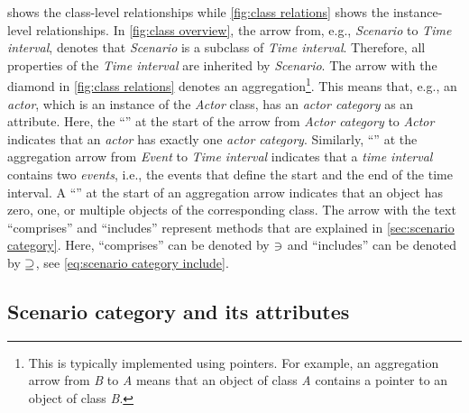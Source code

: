 \cstartd {} shows the class-level relationships while \cref{fig:class relations} shows the instance-level relationships.
In \cref{fig:class overview}, the arrow from, e.g., \textit{Scenario} to \textit{Time interval}, denotes that \textit{Scenario} is a subclass of \textit{Time interval}. Therefore, all properties of the \textit{Time interval} are inherited by \textit{Scenario}. 
The arrow with the diamond in \cref{fig:class relations} denotes an aggregation\footnote{This is typically implemented using pointers. For example, an aggregation arrow from \textit{B} to \textit{A} means that an object of class \textit{A} contains a pointer to an object of class \textit{B}.}.
This means that, e.g., an \textit{actor}, which is an instance of the \textit{Actor} class, has an \textit{actor category} as an attribute. \cendd
Here, the ``\hasone'' at the start of the arrow from \textit{Actor category} to \textit{Actor} indicates that an \textit{actor} has \cstartd exactly \cendd one \textit{actor category}.
\cstartb Similarly, ``\hastwo'' at the aggregation arrow from \textit{Event} to \textit{Time interval} indicates that a \textit{time interval} contains two \textit{events}, i.e., the events that define the start and the end of the time interval. \cendb 
A ``\hasn'' at the start of an aggregation arrow indicates that an object has zero, one, or multiple objects of the corresponding class.
The arrow with the text ``comprises'' and ``includes'' represent methods that are explained in \cref{sec:scenario category}. Here, ``comprises'' can be denoted by $\ni$ and ``includes'' can be denoted by $\supseteq$, see \cref{eq:scenario category include}. 

\begin{figure*}[t]
	\centering
	
	\caption{Schematic overview of most classes of our \acf{oof}.}
	\label{fig:class overview}
\end{figure*}

\begin{figure*}[t]
	\centering
	
	\caption{Schematic overview of the relation between the classes for representing the scenarios for the assessment of \acp{av}.}
	\label{fig:class relations}
\end{figure*}



\subsection{Scenario category and its attributes}
\label{sec:domain scenario category}


